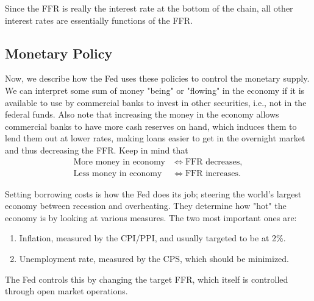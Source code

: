 \documentclass{article}
\begin{document}
    Since the FFR is really the interest rate at the bottom of the chain, all other interest rates are essentially functions of the FFR.   

  \subsection{Monetary Policy}

    Now, we describe how the Fed uses these policies to control the monetary supply. We can interpret some sum of money "being" or "flowing" in the economy if it is available to use by commercial banks to invest in other securities, i.e., not in the federal funds. Also note that increasing the money in the economy allows commercial banks to have more cash reserves on hand, which induces them to lend them out at lower rates, making loans easier to get in the overnight market and thus decreasing the FFR. Keep in mind that
    \begin{align*} 
      \text{More money in economy} & \iff \text{FFR decreases}, \\
      \text{Less money in economy} & \iff \text{FFR increases}.
    \end{align*}

    Setting borrowing costs is how the Fed does its job; steering the world's largest economy between recession and overheating. They determine how "hot" the economy is by looking at various measures. The two most important ones are: 
    \begin{enumerate}
      \item Inflation, measured by the CPI/PPI, and usually targeted to be at 2\%. 
      \item Unemployment rate, measured by the CPS, which should be minimized. 
    \end{enumerate}
    The Fed controls this by changing the target FFR, which itself is controlled through open market operations. 
\end{document}
